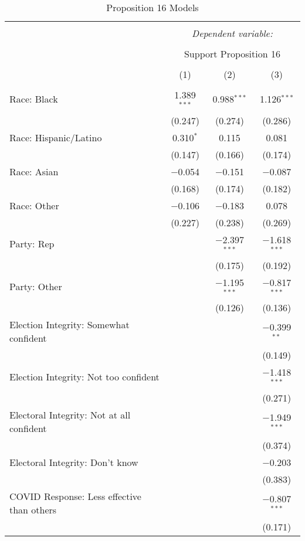 
\begin{table}[!htbp] \centering 
  \caption{Proposition 16 Models} 
  \label{tab:reg_prop16_short} 
\footnotesize 
\begin{tabular}{@{\extracolsep{5pt}}lccc} 
\\[-1.8ex]\hline 
\hline \\[-1.8ex] 
 & \multicolumn{3}{c}{\textit{Dependent variable:}} \\ 
\cline{2-4} 
\\[-1.8ex] & \multicolumn{3}{c}{Support Proposition 16} \\ 
\\[-1.8ex] & (1) & (2) & (3)\\ 
\hline \\[-1.8ex] 
 Race: Black & 1.389$^{***}$ & 0.988$^{***}$ & 1.126$^{***}$ \\ 
  & (0.247) & (0.274) & (0.286) \\ 
  Race: Hispanic/Latino & 0.310$^{*}$ & 0.115 & 0.081 \\ 
  & (0.147) & (0.166) & (0.174) \\ 
  Race: Asian & $-$0.054 & $-$0.151 & $-$0.087 \\ 
  & (0.168) & (0.174) & (0.182) \\ 
  Race: Other & $-$0.106 & $-$0.183 & 0.078 \\ 
  & (0.227) & (0.238) & (0.269) \\ 
  Party: Rep &  & $-$2.397$^{***}$ & $-$1.618$^{***}$ \\ 
  &  & (0.175) & (0.192) \\ 
  Party: Other &  & $-$1.195$^{***}$ & $-$0.817$^{***}$ \\ 
  &  & (0.126) & (0.136) \\ 
  Election Integrity: Somewhat confident &  &  & $-$0.399$^{**}$ \\ 
  &  &  & (0.149) \\ 
  Election Integrity: Not too confident &  &  & $-$1.418$^{***}$ \\ 
  &  &  & (0.271) \\ 
  Electoral Integrity: Not at all confident &  &  & $-$1.949$^{***}$ \\ 
  &  &  & (0.374) \\ 
  Electoral Integrity: Don't know &  &  & $-$0.203 \\ 
  &  &  & (0.383) \\ 
  COVID Response: Less effective than others &  &  & $-$0.807$^{***}$ \\ 
  &  &  & (0.171) \\ 

\end{tabular}
\end{table}
